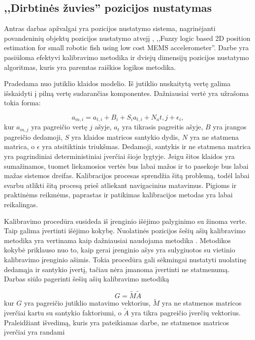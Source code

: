 \subsection{,,Dirbtinės žuvies'' pozicijos nustatymas}

Antras darbas apžvalgai yra pozicijos nustatymo sistema, nagrinėjanti povandeninių objektų pozicijos nustatymo atvejį \cite{yoo2011fuzzy}, ,,Fuzzy logic based 2D position estimation for small robotic fish using low cost MEMS accelerometer''. Darbe yra pasiūloma efektyvi kalibravimo metodika ir dviejų dimensijų pozicijos nustatymo algoritmas, kuris yra paremtas raiškios logikos metodika.

Pradedama nuo jutiklio klaidos modelio. Iš jutiklio nuskaitytą vertę galima išskaidyti į pilną vertę sudarančias komponentes. Dažniausiai vertė yra užrašoma tokia forma:

\begin{equation}
    a_{m,i} = a_{t,i} + B_i + S_{i}a_{t,i} + N_a{t,j} + \epsilon_i,
\end{equation}
kur $a_{m,j}$ yra pagreičio vertę $j$ ašyje, $a_t$ yra tikrasis pagreitis ašyje, $B$ yra įrangos pagreičio dedamoji, $S$ yra klaidos matricos santykio dydis, $N$ yra ne statmena matrica, o $\epsilon$ yra atsitiktinis triukšmas. Dedamoji, santykis ir ne statmena matrica yra pagrindiniai deterministiniai įverčiai šioje lygtyje. Jeigu šitos klaidos yra sumažinamos, tuomet liekamosios vertės bus labai mažos ir to pasekoje bus labai mažas sistemos dreifas. Kalibracijos procesas sprendžia šitą problemą, todėl labai svarbu atlikti šitą procesą prieš atliekant navigacinius matavimus. Pigioms ir praktinėms reikmėms, paprastas ir patikimas kalibracijos metodas yra labai reikalingas.

Kalibravimo procedūra susideda iš įrenginio išėjimo palyginimo su žinoma verte. Taip galima įvertinti išėjimo kokybę. Nuolatinės pozicijos šešių ašių kalibravimo metodika yra vertinama kaip dažniausiai naudojama metodika \cite{syed2007new}. Metodikos kokybė priklauso nuo to, kaip gerai įrenginio ašys yra sulygiuotos su vietinio kalibravimo įrenginio ašimis. Tokia procedūra gali sėkmingai nustatyti nuolatinę dedamąja ir santykio įvertį, tačiau nėra įmanoma įvertinti ne statmenumą. Darbas siūlo pagerinti šešių ašių kalibravimo metodiką

\begin{equation}
    G = \tilde{M} \tilde{A}
\end{equation}
kur $G$ yra pagreičio jutiklio matavimo vektorius, $\tilde{M}$ yra ne statmenos matricos įverčiai kartu su santykio faktoriumi, o $\tilde{A}$ yra tikra pagreičio įverčių vektorius. Praleidžiant išvedimą, kuris yra pateikiamas darbe, ne statmenos matricos įverčiai yra randami

